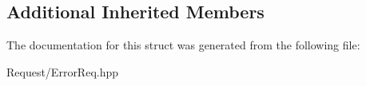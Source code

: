 \subsection*{Additional Inherited Members}


The documentation for this struct was generated from the following file\+:\begin{DoxyCompactItemize}
\item 
Request/Error\+Req.\+hpp\end{DoxyCompactItemize}
